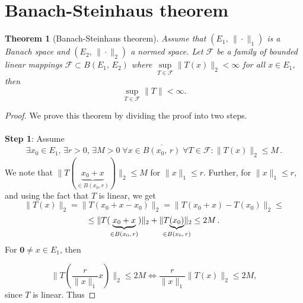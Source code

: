 \documentclass[12pt, a4paper]{article}
\newtheorem{theorem}{Theorem}[section]
\begin{document}
\section{Banach-Steinhaus theorem}
\begin{theorem}[Banach-Steinhaus theorem]
Assume that $(E_1,\,\|\cdot\|_1)$ is a Banach space and $(E_2,\,\|\cdot\|_2)$ a normed space. Let $\mathcal{F}$ be a family of bounded linear mappings $\mathcal{F}\subset B(E_1,\,E_2)$ where $\underset{T\in\mathcal{F}}{\operatorname{sup}}\|T(x)\|_2<\infty$ for all $x\in E_1$, then
\begin{equation}
\underset{T\in\mathcal{F}}{\operatorname{sup}}\|T\|<\infty.
\label{banach-steinhaus0}
\end{equation}
\end{theorem}
\begin{proof}
We prove this theorem by dividing the proof into two steps. \\\\
\textbf{Step 1}: Assume 
\begin{equation}
\exists x_0\in E_1,\,\exists r>0,\, \exists M>0\;\forall x\in\overline{B(x_0,\,r)}\;\forall T\in\mathcal{F}:\|T(x)\|_2\leq M\,.
\label{banach-steinhaus1}
\end{equation}
We note that $\|T(\underbrace{x_0+x}_{\in B(x_0, r)})\|_2\leq M$ for $\|x\|_1\leq r$. Further, for $\|x\|_1\leq r$, and using the fact that $T$ is linear, we get
\[
    \|T(x)\|_2=\|T(x_0+x-x_0)\|_2=\|T(x_0+x)-T(x_0)\|_2\leq
\]
\[
    \leq \|{T(\underbrace{x_0+x}_{\in{B(x_0,\,r)}})\|_2+\|}T(\hspace{-12pt}\underbrace{x_0}_{\in B(x_0,\,r)}\hspace{-12pt}) \|_2\leq 2M\,.
\]
For $\mathbf{0}\neq x\in E_1$, then


\[
\|T\left(\frac{r}{\|x\|_1}x \right) \|_2\leq 2M \Leftrightarrow \frac{r}{\|x\|_1}\|T(x)\|_2 \leq 2M,
\]
since $T$ is linear. Thus


\end{proof}
\end{document}
